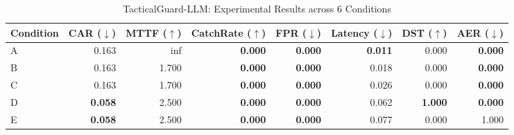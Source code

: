 \begin{table}[t]
\centering
\caption{TacticalGuard-LLM: Experimental Results across 6 Conditions}
\label{tab:results}
\begin{tabular}{lrrrrrrr}
\toprule
Condition & CAR ($\downarrow$) & MTTF ($\uparrow$) & CatchRate ($\uparrow$) & FPR ($\downarrow$) & Latency ($\downarrow$) & DST ($\uparrow$) & AER ($\downarrow$) \\
\midrule
A & 0.163 & inf & \textbf{0.000} & \textbf{0.000} & \textbf{0.011} & 0.000 & \textbf{0.000} \\
B & 0.163 & 1.700 & \textbf{0.000} & \textbf{0.000} & 0.018 & 0.000 & \textbf{0.000} \\
C & 0.163 & 1.700 & \textbf{0.000} & \textbf{0.000} & 0.026 & 0.000 & \textbf{0.000} \\
D & \textbf{0.058} & 2.500 & \textbf{0.000} & \textbf{0.000} & 0.062 & \textbf{1.000} & \textbf{0.000} \\
E & \textbf{0.058} & 2.500 & \textbf{0.000} & \textbf{0.000} & 0.077 & 0.000 & 1.000 \\
\bottomrule
\end{tabular}
\end{table}